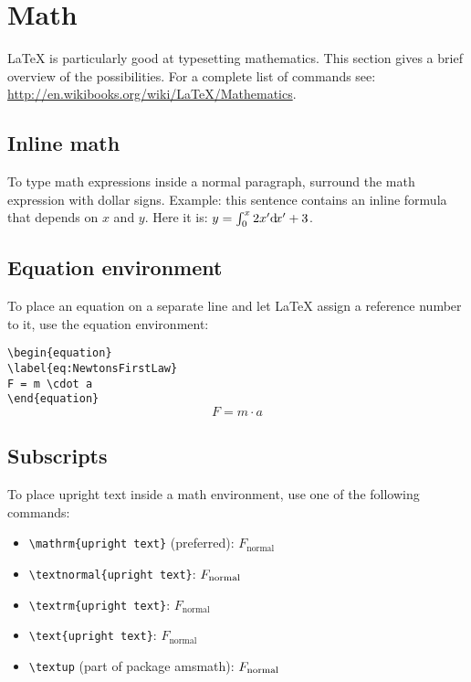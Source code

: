 \documentclass{article}
\begin{document}
\section{Math}

\LaTeX{} is particularly good at typesetting mathematics. This section gives a brief overview of the possibilities. For a complete list of commands see: \url{http://en.wikibooks.org/wiki/LaTeX/Mathematics}.

\subsection{Inline math}

To type math expressions inside a normal paragraph, surround the math expression with dollar signs. Example: this sentence contains an inline formula that depends on $x$ and $y$. Here it is: $y=\int_{0}^{x} 2x'\textnormal{d}\!x'+3 $.

\subsection{Equation environment}

To place an equation on a separate line and let \LaTeX{} assign a reference number to it, use the equation environment:
\vspace{1em}

\noindent\verb|\begin{equation}|\\
\verb|\label{eq:NewtonsFirstLaw}|\\
\verb|F = m \cdot a|\\
\verb|\end{equation}|\\

\begin{equation}
\label{eq:NewtonsFirstLaw}
F = m \cdot a
\end{equation}

\subsection{Subscripts}

To place upright text inside a math environment, use one of the following commands:

\begin{itemize}
	\item \verb|\mathrm{upright text}| (preferred): $F_\mathrm{normal}$
	\item \verb|\textnormal{upright text}|: $F_\textnormal{normal}$
	\item \verb|\textrm{upright text}|: $F_\textrm{normal}$
	\item \verb|\text{upright text}|: $F_\text{normal}$
	\item \verb|\textup| (part of package amsmath): $F_\textup{normal}$
\end{itemize}
\end{document}
